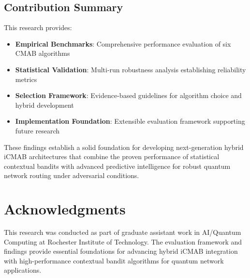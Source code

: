 \documentclass[12pt,a4paper]{article}
\newcommand{\primarytext}[1]{\textcolor{primaryblue}{\textbf{#1}}}
\newcommand{\secondarytext}[1]{\textcolor{secondaryblue}{\textbf{#1}}}
\newcommand{\success}[1]{\textcolor{accentgreen}{\textbf{#1}}}
\begin{document}
\subsection{Contribution Summary}

This research provides:

\begin{itemize}
\item \primarytext{Empirical Benchmarks}: Comprehensive performance evaluation of six CMAB algorithms
\item \success{Statistical Validation}: Multi-run robustness analysis establishing reliability metrics
\item \secondarytext{Selection Framework}: Evidence-based guidelines for algorithm choice and hybrid development
\item \textbf{Implementation Foundation}: Extensible evaluation framework supporting future research
\end{itemize}

These findings establish a solid foundation for developing next-generation hybrid iCMAB architectures that combine the proven performance of statistical contextual bandits with advanced predictive intelligence for robust quantum network routing under adversarial conditions.

\section{Acknowledgments}

This research was conducted as part of graduate assistant work in AI/Quantum Computing at Rochester Institute of Technology. The evaluation framework and findings provide essential foundations for advancing hybrid iCMAB integration with high-performance contextual bandit algorithms for quantum network applications.
\end{document}
